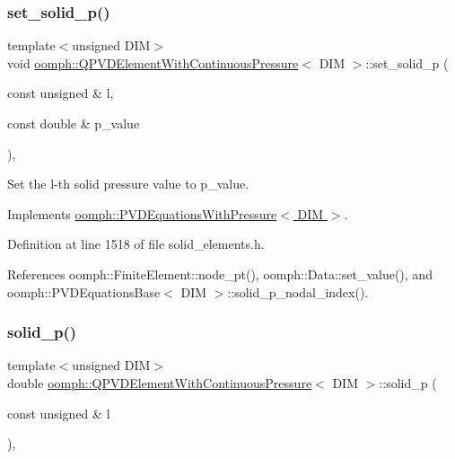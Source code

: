 \subsubsection{\texorpdfstring{set\+\_\+solid\+\_\+p()}{set\_solid\_p()}}
{\footnotesize\ttfamily template$<$unsigned D\+IM$>$ \\
void \hyperlink{classoomph_1_1QPVDElementWithContinuousPressure}{oomph\+::\+Q\+P\+V\+D\+Element\+With\+Continuous\+Pressure}$<$ D\+IM $>$\+::set\+\_\+solid\+\_\+p (\begin{DoxyParamCaption}\item[{const unsigned \&}]{l,  }\item[{const double \&}]{p\+\_\+value }\end{DoxyParamCaption})\hspace{0.3cm}{\ttfamily [inline]}, {\ttfamily [virtual]}}



Set the l-\/th solid pressure value to p\+\_\+value. 



Implements \hyperlink{classoomph_1_1PVDEquationsWithPressure_a35b462a689e05929fa15a9abd2b920f0}{oomph\+::\+P\+V\+D\+Equations\+With\+Pressure$<$ D\+I\+M $>$}.



Definition at line 1518 of file solid\+\_\+elements.\+h.



References oomph\+::\+Finite\+Element\+::node\+\_\+pt(), oomph\+::\+Data\+::set\+\_\+value(), and oomph\+::\+P\+V\+D\+Equations\+Base$<$ D\+I\+M $>$\+::solid\+\_\+p\+\_\+nodal\+\_\+index().

\mbox{\label{classoomph_1_1QPVDElementWithContinuousPressure_a28df8e859a4201842857e6ad7dbc7ecd}} 
\subsubsection{\texorpdfstring{solid\+\_\+p()}{solid\_p()}}
{\footnotesize\ttfamily template$<$unsigned D\+IM$>$ \\
double \hyperlink{classoomph_1_1QPVDElementWithContinuousPressure}{oomph\+::\+Q\+P\+V\+D\+Element\+With\+Continuous\+Pressure}$<$ D\+IM $>$\+::solid\+\_\+p (\begin{DoxyParamCaption}\item[{const unsigned \&}]{l }\end{DoxyParamCaption})\hspace{0.3cm}{\ttfamily [inline]}, {\ttfamily [virtual]}}

